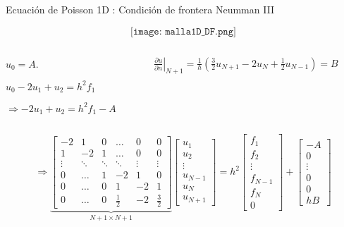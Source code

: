 \documentclass[handout]{beamer}
\begin{document}
\begin{frame}{Ecuaci\'on de Poisson 1D : Condici\'on de frontera Neumman III}

$$\texttt{[image: malla1D\_DF.png]}$$

\begin{footnotesize}
\begin{columns}
\begin{column}{0.40\textwidth}
$ u_0  = A $.

$u_{0} - 2 u_{1} + u_{2} = h^2 f_1$ 

$\Rightarrow \boxed{-2 u_{1} + u_{2} = h^2 f_1 - A}$
\end{column}
\begin{column}{0.6\textwidth}
$\left.\displaystyle \frac{\partial u}{\partial n}\right|_{N+1}  = 
\boxed{\frac{1}{h}\left( \frac{3}{2} u_{N+1} - 2 u_{N} + \frac{1}{2} u_{N-1} \right) = B}$

\end{column}
\end{columns}

\pause

\vspace{0.25cm}

\[
\Longrightarrow
\underbrace{
\left[
  \begin{matrix}
    -2 & 1 & 0  & \dots & 0 & 0  \\
    1 & -2 & 1  & \dots & 0 & 0 \\
    \vdots & \ddots & \ddots & \ddots & \vdots & \vdots \\
    0 & \dots & 1 & -2 & 1 & 0 \\
    0 & \dots & 0 & 1 & -2 & 1 \\
    0 & \dots & 0 & \frac{1}{2} & -2 & \frac{3}{2}        
  \end{matrix}
\right] 
}_{N+1 \times N+1}
\left[
\begin{matrix}
u_1 \\ u_2 \\ \vdots \\ u_{N-1} \\ u_N \\ u_{N+1}
\end{matrix}
\right]= 
h^2 \left[
\begin{matrix}
f_1 \\ f_2 \\ \vdots \\ f_{N-1} \\ f_N \\ 0
\end{matrix}
\right] +
\left[
\begin{matrix}
-A \\ 0 \\  \vdots \\ 0 \\ 0 \\ hB
\end{matrix}
\right]
\]


\end{footnotesize}

\end{frame}
\end{document}
